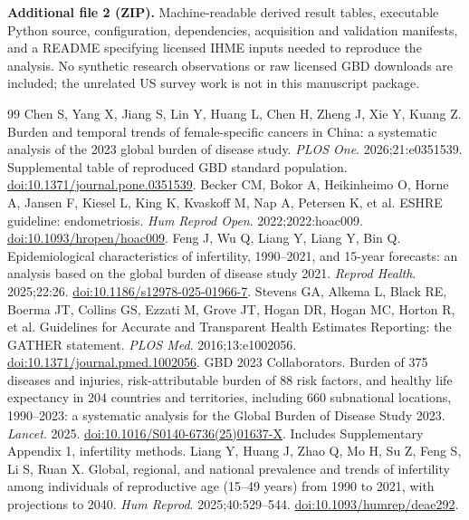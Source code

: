\documentclass[11pt,a4paper]{article}
\begin{document}
\textbf{Additional file 2 (ZIP).} Machine-readable derived result tables, executable Python source, configuration, dependencies, acquisition and validation manifests, and a README specifying licensed IHME inputs needed to reproduce the analysis. No synthetic research observations or raw licensed GBD downloads are included; the unrelated US survey work is not in this manuscript package.
{\small\doublespacing
\begin{thebibliography}{99}
 Chen S, Yang X, Jiang S, Lin Y, Huang L, Chen H, Zheng J, Xie Y, Kuang Z. Burden and temporal trends of female-specific cancers in China: a systematic analysis of the 2023 global burden of disease study. \emph{PLOS One}. 2026;21:e0351539. Supplemental table of reproduced GBD standard population. \href{https://doi.org/10.1371/journal.pone.0351539}{doi:10.1371/journal.pone.0351539}.
Becker CM, Bokor A, Heikinheimo O, Horne A, Jansen F, Kiesel L, King K, Kvaskoff M, Nap A, Petersen K, et al. ESHRE guideline: endometriosis. \emph{Hum Reprod Open}. 2022;2022:hoac009. \href{https://doi.org/10.1093/hropen/hoac009}{doi:10.1093/hropen/hoac009}.
Feng J, Wu Q, Liang Y, Liang Y, Bin Q. Epidemiological characteristics of infertility, 1990--2021, and 15-year forecasts: an analysis based on the global burden of disease study 2021. \emph{Reprod Health}. 2025;22:26. \href{https://doi.org/10.1186/s12978-025-01966-7}{doi:10.1186/s12978-025-01966-7}.
 Stevens GA, Alkema L, Black RE, Boerma JT, Collins GS, Ezzati M, Grove JT, Hogan DR, Hogan MC, Horton R, et al. Guidelines for Accurate and Transparent Health Estimates Reporting: the GATHER statement. \emph{PLOS Med}. 2016;13:e1002056. \href{https://doi.org/10.1371/journal.pmed.1002056}{doi:10.1371/journal.pmed.1002056}.
 GBD 2023 Collaborators. Burden of 375 diseases and injuries, risk-attributable burden of 88 risk factors, and healthy life expectancy in 204 countries and territories, including 660 subnational locations, 1990--2023: a systematic analysis for the Global Burden of Disease Study 2023. \emph{Lancet}. 2025. \href{https://doi.org/10.1016/S0140-6736(25)01637-X}{doi:10.1016/S0140-6736(25)01637-X}. Includes Supplementary Appendix 1, infertility methods.
 Liang Y, Huang J, Zhao Q, Mo H, Su Z, Feng S, Li S, Ruan X. Global, regional, and national prevalence and trends of infertility among individuals of reproductive age (15--49 years) from 1990 to 2021, with projections to 2040. \emph{Hum Reprod}. 2025;40:529--544. \href{https://doi.org/10.1093/humrep/deae292}{doi:10.1093/humrep/deae292}.

\end{thebibliography}}
\end{document}
